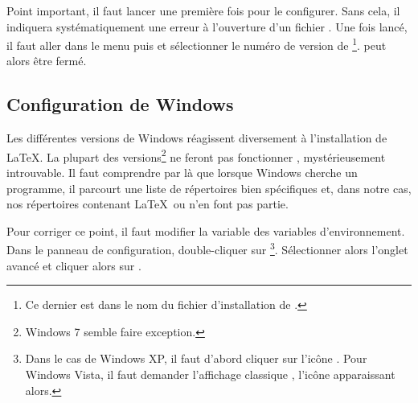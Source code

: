Point important, il faut lancer une première fois  pour le configurer. Sans cela, il indiquera systématiquement une erreur à l'ouverture d'un fichier . Une fois lancé, il faut aller dans le menu  puis  et sélectionner le numéro de version de \footnote{Ce dernier est dans le nom du fichier d'installation de .}.  peut alors être fermé.


\subsection{Configuration de Windows}

Les différentes versions de Windows réagissent diversement à l'installation de \LaTeX. La plupart des versions\footnote{Windows 7 semble faire exception.} ne feront pas fonctionner , mystérieusement introuvable. Il faut comprendre par là que lorsque Windows cherche un programme, il parcourt une liste de répertoires bien spécifiques et, dans notre cas, nos répertoires contenant \LaTeX\ ou  n'en font pas partie.

Pour corriger ce point, il faut modifier la variable  des variables d'environnement. Dans le panneau de configuration, double-cliquer sur \footnote{Dans le cas de Windows XP, il faut d'abord cliquer sur l'icône . Pour Windows Vista, il faut demander l'affichage \og classique \fg, l'icône  apparaissant alors.}. Sélectionner alors l'onglet avancé et cliquer alors sur . 

